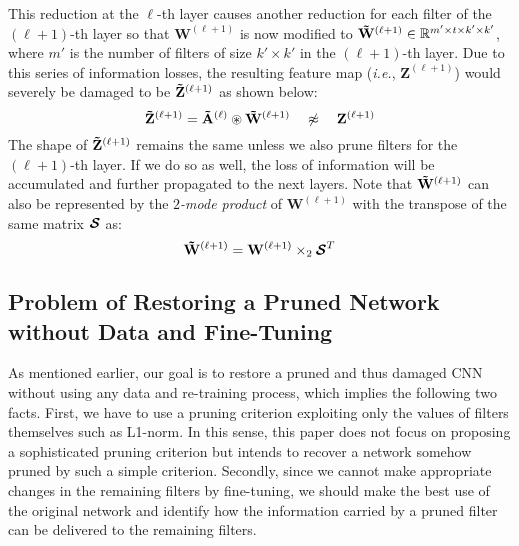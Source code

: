 This reduction at the $\ell$-th layer causes another reduction for each filter of the $(\ell+1)$-th layer so that $\mathbf{W}^{(\ell+1)}$ is now modified to $\mathbf{\Tilde{W}}^{(\ell+1)} \in \mathbb{R}^{m' \times t \times k' \times k'}$, where $m'$ is the number of filters of size $k' \times k'$ in the $(\ell+1)$-th layer. Due to this series of information losses, the resulting feature map (\textit{i.e.}, $\mathbf{Z}^{(\ell+1)}$) would severely be damaged to be $\mathbf{\Tilde{Z}}^{(\ell+1)}$ as shown below:
\begin{equation}
{\mathbf{\Tilde{Z}}}^{{(\ell+1)}} = \mathbf{\Tilde{A}}^{(\ell)} \circledast {\mathbf{\Tilde{W}}}^{(\ell+1)}~~~\not\approx~~~\mathbf{Z}^{(\ell+1)}
\label{eq:eq}\nonumber
\end{equation}
The shape of $\mathbf{\Tilde{Z}}^{(\ell+1)}$ remains the same unless we also prune filters for the $(\ell+1)$-th layer. If we do so as well, the loss of information will be accumulated and further propagated to the next layers. Note that $\mathbf{\Tilde{W}}^{(\ell+1)}$ can also be represented by the \textit{$2$-mode product} \cite{DBLP:journals/siamrev/KoldaB09} of $\mathbf{W}^{(\ell+1)}$ with the transpose of the same matrix $\boldsymbol{\S}$ as:
\begin{equation} \label{eq:pruning2}
\mathbf{\Tilde{W}}^{(\ell+1)} = {\mathbf{W}}^{(\ell+1)} \times_{2} {\boldsymbol{\S}^T}
\end{equation}




\subsection{Problem of Restoring a Pruned Network without Data and Fine-Tuning}
As mentioned earlier, our goal is to restore a pruned and thus damaged CNN without using any data and re-training process, which implies the following two facts. First, we have to use a pruning criterion exploiting only the values of filters themselves such as L1-norm. In this sense, this paper does not focus on proposing a sophisticated pruning criterion but intends to recover a network somehow pruned by such a simple criterion. Secondly, since we cannot make appropriate changes in the remaining filters by fine-tuning, we should make the best use of the original network and identify how the information carried by a pruned filter can be delivered to the remaining filters.


